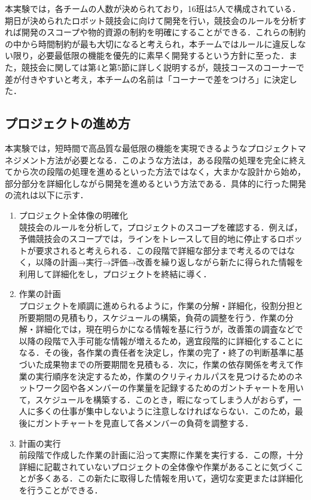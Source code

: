 \begin{multicols*}{2}
本実験では，各チームの人数が決められており，16班は5人で構成されている．期日が決められたロボット競技会に向けて開発を行い，競技会のルールを分析すれば開発のスコープや物的資源の制約を明確にすることができる．これらの制約の中から時間制約が最も大切になると考えられ，本チームではルールに違反しない限り，必要最低限の機能を優先的に素早く開発するという方針に至った．また，競技会に関しては第4と第5節に詳しく説明するが，競技コースのコーナーで差が付きやすいと考え，本チームの名前は「コーナーで差をつけろ」に決定した．

\subsection{プロジェクトの進め方}
本実験では，短時間で高品質な最低限の機能を実現できるようなプロジェクトマネジメント方法が必要となる．このような方法は，ある段階の処理を完全に終えてから次の段階の処理を進めるといった方法ではなく，大まかな設計から始め，部分部分を詳細化しながら開発を進めるという方法である．具体的に行った開発の流れは以下に示す．
\begin{enumerate}
  \item プロジェクト全体像の明確化\\ 競技会のルールを分析して，プロジェクトのスコープを確認する．例えば，予備競技会のスコープでは，ラインをトレースして目的地に停止するロボットが要求されると考えられる．この段階で詳細な部分まで考えるのではなく，以降の計画→実行→評価→改善を繰り返しながら新たに得られた情報を利用して詳細化をし，プロジェクトを終結に導く．
  \item 作業の計画\\ プロジェクトを順調に進められるように，作業の分解・詳細化，役割分担と所要期間の見積もり，スケジュールの構築，負荷の調整を行う．作業の分解・詳細化では，現在明らかになる情報を基に行うが，改善策の調査などで以降の段階で入手可能な情報が増えるため，適宜段階的に詳細化することになる．その後，各作業の責任者を決定し，作業の完了・終了の判断基準に基づいた成果物までの所要期間を見積もる．次に，作業の依存関係を考えて作業の実行順序を決定するため，作業のクリティカルパスを見つけるためのネットワーク図や各メンバーの作業量を記録するためのガントチャートを用いて，スケジュールを構築する．このとき，暇になってしまう人がおらず，一人に多くの仕事が集中しないように注意しなければならない．このため，最後にガントチャートを見直して各メンバーの負荷を調整する．
  \item 計画の実行\\ 前段階で作成した作業の計画に沿って実際に作業を実行する．この際，十分詳細に記載されていないプロジェクトの全体像や作業があることに気づくことが多くある．この新たに取得した情報を用いて，適切な変更または詳細化を行うことができる．

\end{enumerate}
\end{multicols*}
